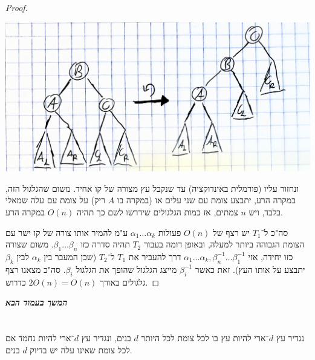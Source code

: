 \documentclass[]{article}
\newcommand\npage {\vfil {\hfil \textbf{\textit{המשך בעמוד הבא}}} \hfil \vfil \pagebreak}
\newcommand\ag        {\alpha}
\newcommand\bg        {\beta}
\newcommand\op    {^{-1}}
\theoremstyle{definition}
\begin{document}
\begin{enumerate}[A.]
\begin{proof}
			\begin{center}
				\includegraphics[width=0.35\linewidth]{images/something2}
			\end{center}
			
			ונחזור עליו (פורמלית באינדוקציה) עד שנקבל עץ מצורה של קו אחיד. משום שהגלגול הזה, במקרה הרע, יתבצע צומת עם שני עלים או (במקרה בו $A$ ריק) על צומת עם עלה שמאלי בלבד, ויש $n$ צמתים, אז כמות הגלגולים שידרשו לשם כך תהיה $O(n)$ במקרה הרע. 
			
			סה"כ ל־$T_1$ יש רצף של $O(n)$ פעולות $\ag _1 \dots \ag_k$ ע"מ להמיר אותו צורה של קו ישר עם הצומת הגבוהה ביותר למעלה, ובאופן דומה בעבור $T_2$ תהיה סדרה כזו $\bg_1 \dots \bg_n$. משום שצורה כזו יחידה, אזי $\ag_1 \dots \ag_k, \bg_n\op \dots \bg_1\op$ דרך להעביר את $T_1$ ל־$T_2$ (שכן המעבר בין $\ag_k$ לבין $\bg_k$ יתבצע על אותו העץ). זאת כאשר $\bg_i\op$ מייצג הגלגול שהופך את הגלגול $\bg_i$. סה"כ מצאנו רצף גלגולים באורך $2O(n) = O(n)$  כדרוש. 
		\end{proof}
	\end{enumerate}
	\npage
	\section{}
	נגדיר עץ $d$־ארי להיות עץ בו לכל צומת לכל היותר $d$ בנים, ונגדיר עץ $d$־ארי להיות נחמד אם לכל צומת שאינו עלה יש בדיוק $d$ בנים. 
	
\end{document}
